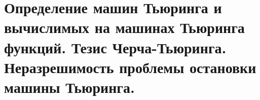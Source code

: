 \section{Определение машин Тьюринга и вычислимых на машинах Тьюринга функций. Тезис Черча-Тьюринга. Неразрешимость проблемы остановки машины Тьюринга.}